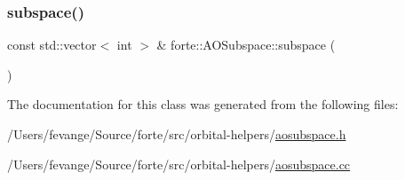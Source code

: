 \subsubsection{\texorpdfstring{subspace()}{subspace()}}
{\footnotesize\ttfamily const std\+::vector$<$ int $>$ \& forte\+::\+A\+O\+Subspace\+::subspace (\begin{DoxyParamCaption}{ }\end{DoxyParamCaption})}



The documentation for this class was generated from the following files\+:\begin{DoxyCompactItemize}
\item 
/\+Users/fevange/\+Source/forte/src/orbital-\/helpers/\mbox{\hyperlink{aosubspace_8h}{aosubspace.\+h}}\item 
/\+Users/fevange/\+Source/forte/src/orbital-\/helpers/\mbox{\hyperlink{aosubspace_8cc}{aosubspace.\+cc}}\end{DoxyCompactItemize}
